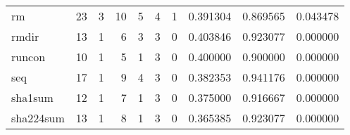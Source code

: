 \begin{tabular}{lrrrrrrrrr}
rm        &                                       23 &                                                  3 &                                                 10 &                                                  5 &                                                  4 &                                                  1 &                                           0.391304 &                               0.869565 &                             0.043478 \\
rmdir     &                                       13 &                                                  1 &                                                  6 &                                                  3 &                                                  3 &                                                  0 &                                           0.403846 &                               0.923077 &                             0.000000 \\
runcon    &                                       10 &                                                  1 &                                                  5 &                                                  1 &                                                  3 &                                                  0 &                                           0.400000 &                               0.900000 &                             0.000000 \\
seq       &                                       17 &                                                  1 &                                                  9 &                                                  4 &                                                  3 &                                                  0 &                                           0.382353 &                               0.941176 &                             0.000000 \\
sha1sum   &                                       12 &                                                  1 &                                                  7 &                                                  1 &                                                  3 &                                                  0 &                                           0.375000 &                               0.916667 &                             0.000000 \\
sha224sum &                                       13 &                                                  1 &                                                  8 &                                                  1 &                                                  3 &                                                  0 &                                           0.365385 &                               0.923077 &                             0.000000 \\

\end{tabular}
